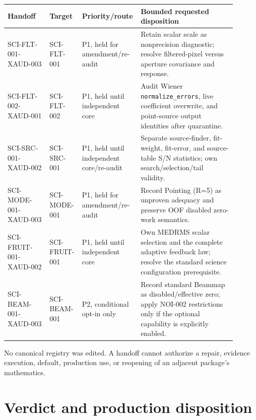 \documentclass[11pt]{article}
\newcommand{\code}[1]{\nolinkurl{#1}}
\begin{document}
\begin{longtable}{L{0.18\linewidth}L{0.14\linewidth}L{0.17\linewidth}L{0.41\linewidth}}
\toprule
Handoff & Target & Priority/route & Bounded requested disposition\\
\midrule
SCI-FLT-001-XAUD-003 & SCI-FLT-001 & P1, held for amendment/re-audit &
Retain scalar scale as nonprecision diagnostic; resolve filtered-pixel versus
aperture covariance and response.\\
SCI-FLT-002-XAUD-001 & SCI-FLT-002 & P1, held until independent core &
Audit Wiener \code{normalize_errors}, live coefficient overwrite, and
point-source output identities after quarantine.\\
SCI-SRC-001-XAUD-002 & SCI-SRC-001 & P1, held until independent core/re-audit &
Separate source-finder, fit-weight, fit-error, and source-table S/N statistics;
own search/selection/tail validity.\\
SCI-MODE-001-XAUD-003 & SCI-MODE-001 & P1, held for amendment/re-audit &
Record Pointing (R=5) as unproven adequacy and preserve OOF disabled zero-work
semantics.\\
SCI-FRUIT-001-XAUD-002 & SCI-FRUIT-001 & P1, held until independent core &
Own MEDRMS scalar selection and the complete adaptive feedback law; resolve the
standard science configuration prerequisite.\\
SCI-BEAM-001-XAUD-003 & SCI-BEAM-001 & P2, conditional opt-in only &
Record standard Beammap as disabled/effective zero; apply NOI-002 restrictions
only if the optional capability is explicitly enabled.\\
\bottomrule
\end{longtable}

No canonical registry was edited.  A handoff cannot authorize a repair,
evidence execution, default, production use, or reopening of an adjacent
package's mathematics.

\section{Verdict and production disposition}
\end{document}
